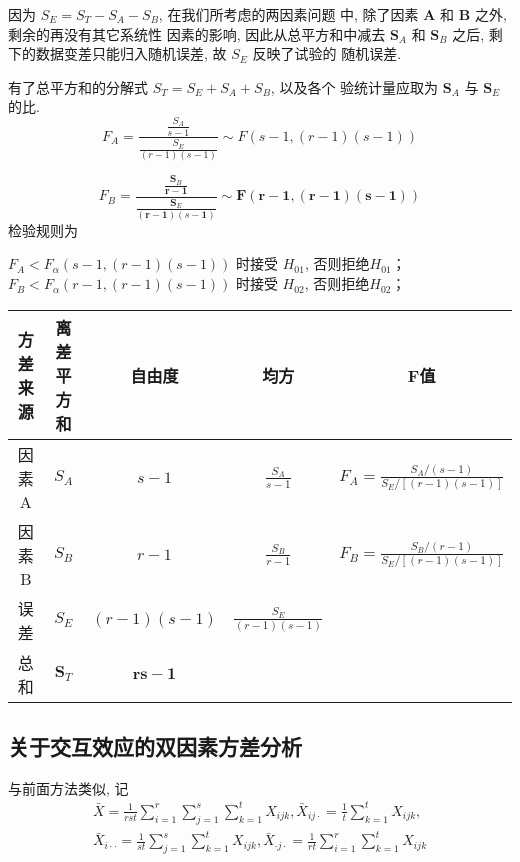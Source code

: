 因为 \( S_{E}=S_{T}-S_{A}-S_{B} \), 在我们所考虑的两因素问题 中, 除了因素 \( \boldsymbol{A} \) 和 \( \boldsymbol{B} \) 之外, 剩余的再没有其它系统性 因素的影响, 因此从总平方和中减去 \( \boldsymbol{S}_{A} \) 和 \( \boldsymbol{S}_{B} \) 之后, 剩 下的数据变差只能归入随机误差, 故 \( S_{E} \) 反映了试验的 随机误差. 

有了总平方和的分解式 \( S_{T}=S_{E}+S_{A}+S_{B} \), 以及各个
验统计量应取为 \( \boldsymbol{S}_{A} \) 与 \( \boldsymbol{S}_{E} \) 的比. 
$$
F_{A}=\frac{\frac{S_{A}}{s-1}}{\frac{S_{E}}{(r-1)(s-1)}} \sim F(s-1,(r-1)(s-1))
$$

$$
F_{B}=\frac{\frac{\boldsymbol{S}_{B}}{\boldsymbol{r}-\mathbf{1}}}{\frac{\boldsymbol{S}_{E}}{(\boldsymbol{r}-\mathbf{1})(s-\mathbf{1})}} \sim \boldsymbol{F}(\boldsymbol{r}-\mathbf{1},(\boldsymbol{r}-\mathbf{1})(\boldsymbol{s}-\mathbf{1}))
$$
检验规则为

\( F_{A}<F_{\alpha}(s-1,(r-1)(s-1)) \) 时接受 \( H_{01} \), 否则拒绝\( H_{01} \)；
\( F_{B}<F_{\alpha}(r-1,(r-1)(s-1)) \) 时接受 \( H_{02} \), 否则拒绝\( H_{02} \)；

\begin{table}
   \begin{tabular}{c|c|c|c|c}
    \hline
            方差来源 & 离差平方和 & 自由度 & 均方 & F值 \\
    \hline 因素 A & \( S_{A} \) & \( s-1 \) & \( \frac{S_{A}}{s-1} \) & \( F_{A}=\frac{S_{A} /(s-1)}{S_{E} /[(r-1)(s-1)]} \) \\
    \hline  因素 B & \( S_{B} \) & \( r-1 \) & \( \frac{S_{B}}{r-1} \) & \( F_{B}=\frac{S_{B} /(r-1)}{S_{E} /[(r-1)(s-1)]} \) \\
    \hline 误 差 & \( S_{E} \) & \( (r-1)(s-1) \) & \( \frac{S_{E}}{(r-1)(s-1)} \) & \\
    \hline 总 和 & \( \boldsymbol{S}_{T} \) & \( \boldsymbol{r s}-\mathbf{1} \) & & \\
    \hline
    \end{tabular} 
\end{table}

\subsection{关于交互效应的双因素方差分析}

与前面方法类似, 记
$$
\begin{array}{l}
\bar{X}=\frac{1}{r s t} \sum_{i=1}^{r} \sum_{j=1}^{s} \sum_{k=1}^{t} X_{i j k}, \bar{X}_{i j \cdot}=\frac{1}{t} \sum_{k=1}^{t} X_{i j k}, \\
\bar{X}_{i \cdot \cdot}=\frac{1}{s t} \sum_{j=1}^{s} \sum_{k=1}^{t} X_{i j k}, \bar{X}_{\cdot j \cdot}=\frac{1}{r t} \sum_{i=1}^{r} \sum_{k=1}^{t} X_{i j k}
\end{array}
$$

